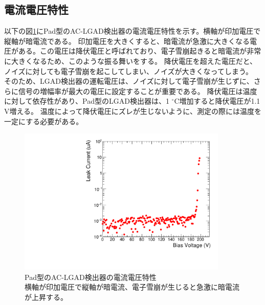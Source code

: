 \subsection{電流電圧特性}
以下の図\ref{fg:IV_true}にPad型のAC-LGAD検出器の電流電圧特性を示す。横軸が印加電圧で縦軸が暗電流である。
印加電圧を大きくすると、暗電流が急激に大きくなる電圧がある。この電圧は降伏電圧と呼ばれており、電子雪崩起きると暗電流が非常に大きくなるため、このような振る舞いをする。
降伏電圧を超えた電圧だと、ノイズに対しても電子雪崩を起こしてしまい、ノイズが大きくなってしまう。
そのため、LGAD検出器の運転電圧は、ノイズに対して電子雪崩が生じずに、さらに信号の増幅率が最大の電圧に設定することが重要である。
降伏電圧は温度に対して依存性があり、Pad型のLGAD検出器は、1 ${}^\circ$C増加すると降伏電圧が1.1 V増える\cite{Kita_Master}。
温度によって降伏電圧にズレが生じないように、測定の際には温度を一定にする必要がある。


\begin{figure}[t]
    \centering
    \includegraphics[width=10cm]{fig/graph/IV_true.pdf}
    \caption[Pad型のAC-LGAD検出器の電流電圧特性]{Pad型のAC-LGAD検出器の電流電圧特性\\横軸が印加電圧で縦軸が暗電流、電子雪崩が生じると急激に暗電流が上昇する。}
    \label{fg:IV_true}
\end{figure}
